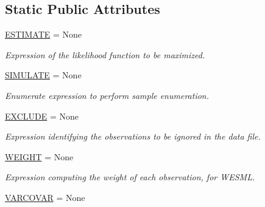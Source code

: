 \subsection*{Static Public Attributes}
\begin{DoxyCompactItemize}
\item 
\hyperlink{classbiogeme_1_1_b_i_o_g_e_m_e___o_b_j_e_c_t_a3e2437d2271f3f9fe27913e1e1312c47}{E\+S\+T\+I\+M\+A\+TE} = None
\begin{DoxyCompactList}\small\item\em Expression of the likelihood function to be maximized. \end{DoxyCompactList}\item 
\hyperlink{classbiogeme_1_1_b_i_o_g_e_m_e___o_b_j_e_c_t_ab1eb6d8235bf68d484b0a81eb7d41003}{S\+I\+M\+U\+L\+A\+TE} = None
\begin{DoxyCompactList}\small\item\em Enumerate expression to perform sample enumeration. \end{DoxyCompactList}\item 
\hyperlink{classbiogeme_1_1_b_i_o_g_e_m_e___o_b_j_e_c_t_a599c398c094f98e58d93b96c2dc81b97}{E\+X\+C\+L\+U\+DE} = None
\begin{DoxyCompactList}\small\item\em Expression identifying the observations to be ignored in the data file. \end{DoxyCompactList}\item 
\hyperlink{classbiogeme_1_1_b_i_o_g_e_m_e___o_b_j_e_c_t_a2a9babe593d7115e3bfd57057ab9c97e}{W\+E\+I\+G\+HT} = None
\begin{DoxyCompactList}\small\item\em Expression computing the weight of each observation, for W\+E\+S\+ML. \end{DoxyCompactList}\item 
\hyperlink{classbiogeme_1_1_b_i_o_g_e_m_e___o_b_j_e_c_t_ad9fc8223d62db27a51cd10f55b796ea0}{V\+A\+R\+C\+O\+V\+AR} = None\hypertarget{classbiogeme_1_1_b_i_o_g_e_m_e___o_b_j_e_c_t_ad9fc8223d62db27a51cd10f55b796ea0}{}\label{classbiogeme_1_1_b_i_o_g_e_m_e___o_b_j_e_c_t_ad9fc8223d62db27a51cd10f55b796ea0}


\end{DoxyCompactItemize}
